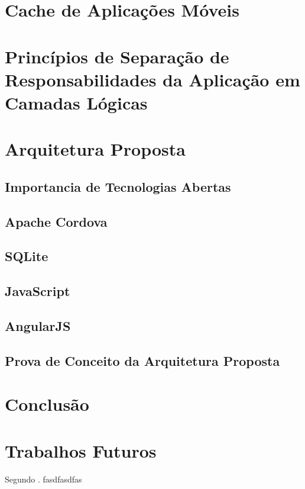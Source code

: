 \documentclass[
	article,			%
	11pt,				%
	oneside,			%
	a4paper,			%
	english,			%
	brazil,				%
	sumario=tradicional
]{abntex2}
\begin{document}
\section{Cache de Aplicações Móveis}

\section{Princípios de Separação de Responsabilidades da Aplicação em Camadas Lógicas}

\section{Arquitetura Proposta}

\subsection{Importancia de Tecnologias Abertas}

\subsection{Apache Cordova}

\subsection{SQLite}

\subsection{JavaScript}

\subsection{AngularJS}

\subsection{Prova de Conceito da Arquitetura Proposta}

\section{Conclusão} \label{introduction}

\section{Trabalhos Futuros} \label{introduction}
Segundo \cite{ivan2014cloud}. fasdfasdfas

{}
\end{document}
